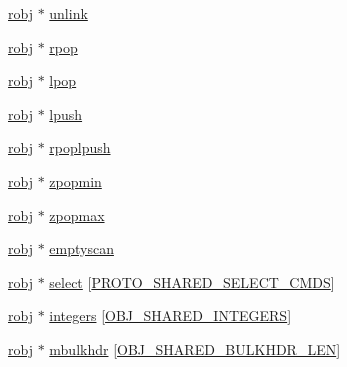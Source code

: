 \begin{DoxyCompactItemize}
\item 
\hyperlink{server_8h_a540f174d2685422fbd7d12e3cd44c8e2}{robj} $\ast$ \hyperlink{structshared_objects_struct_af489983c57174cb5b97002fc2cd1e0d5}{unlink}
\item 
\hyperlink{server_8h_a540f174d2685422fbd7d12e3cd44c8e2}{robj} $\ast$ \hyperlink{structshared_objects_struct_af4f77116ef0692e38caf492ab0ae0aa5}{rpop}
\item 
\hyperlink{server_8h_a540f174d2685422fbd7d12e3cd44c8e2}{robj} $\ast$ \hyperlink{structshared_objects_struct_a2f2790835bd839f996e27b66682e8665}{lpop}
\item 
\hyperlink{server_8h_a540f174d2685422fbd7d12e3cd44c8e2}{robj} $\ast$ \hyperlink{structshared_objects_struct_a74ff42ea3b15dd3271cf5e060e68d2fd}{lpush}
\item 
\hyperlink{server_8h_a540f174d2685422fbd7d12e3cd44c8e2}{robj} $\ast$ \hyperlink{structshared_objects_struct_ac63a0c4f6733ddf45a05ffe9069213fd}{rpoplpush}
\item 
\hyperlink{server_8h_a540f174d2685422fbd7d12e3cd44c8e2}{robj} $\ast$ \hyperlink{structshared_objects_struct_a068ba9c2967d8f0f639a27df62d9122d}{zpopmin}
\item 
\hyperlink{server_8h_a540f174d2685422fbd7d12e3cd44c8e2}{robj} $\ast$ \hyperlink{structshared_objects_struct_ac83914f3396175fb89619333b752fc41}{zpopmax}
\item 
\hyperlink{server_8h_a540f174d2685422fbd7d12e3cd44c8e2}{robj} $\ast$ \hyperlink{structshared_objects_struct_a336652c82ce06dac863197d50697ffe2}{emptyscan}
\item 
\hyperlink{server_8h_a540f174d2685422fbd7d12e3cd44c8e2}{robj} $\ast$ \hyperlink{structshared_objects_struct_a6ee5caf807a005678e7075fd44ce7038}{select} \mbox{[}\hyperlink{server_8h_a950a6acbe9809f9e3dc541e8175b7b44}{P\+R\+O\+T\+O\+\_\+\+S\+H\+A\+R\+E\+D\+\_\+\+S\+E\+L\+E\+C\+T\+\_\+\+C\+M\+DS}\mbox{]}
\item 
\hyperlink{server_8h_a540f174d2685422fbd7d12e3cd44c8e2}{robj} $\ast$ \hyperlink{structshared_objects_struct_a0a900c43b0635b0afef2c83d7def52c7}{integers} \mbox{[}\hyperlink{server_8h_a311fc8b18b93af94e1ad418f1386b519}{O\+B\+J\+\_\+\+S\+H\+A\+R\+E\+D\+\_\+\+I\+N\+T\+E\+G\+E\+RS}\mbox{]}
\item 
\hyperlink{server_8h_a540f174d2685422fbd7d12e3cd44c8e2}{robj} $\ast$ \hyperlink{structshared_objects_struct_a5ba04845895cc30f8583215e1b1bfd32}{mbulkhdr} \mbox{[}\hyperlink{server_8h_aff2f6e62c729d3f8b119d761818be317}{O\+B\+J\+\_\+\+S\+H\+A\+R\+E\+D\+\_\+\+B\+U\+L\+K\+H\+D\+R\+\_\+\+L\+EN}\mbox{]}

\end{DoxyCompactItemize}
